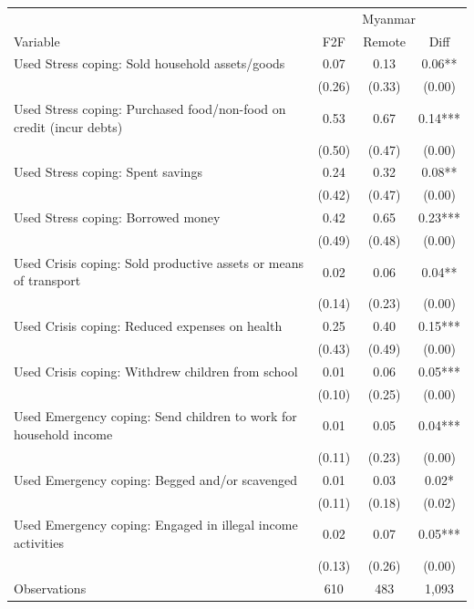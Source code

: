 \begin{tabular}{l*{3}c}
\hline\hline
 & \multicolumn{3}{c}{Myanmar}\\ 
Variable & F2F & Remote & Diff \\
\hline
Used Stress coping: Sold household assets/goods&0.07&0.13&0.06**\\
&(0.26)&(0.33)&(0.00)\\
Used Stress coping: Purchased food/non-food on credit (incur debts)&0.53&0.67&0.14***\\
&(0.50)&(0.47)&(0.00)\\
Used Stress coping: Spent savings&0.24&0.32&0.08**\\
&(0.42)&(0.47)&(0.00)\\
Used Stress coping: Borrowed money&0.42&0.65&0.23***\\
&(0.49)&(0.48)&(0.00)\\
Used Crisis coping: Sold productive assets or means of transport&0.02&0.06&0.04**\\
&(0.14)&(0.23)&(0.00)\\
Used Crisis coping: Reduced expenses on health&0.25&0.40&0.15***\\
&(0.43)&(0.49)&(0.00)\\
Used Crisis coping: Withdrew children from school&0.01&0.06&0.05***\\
&(0.10)&(0.25)&(0.00)\\
Used Emergency coping: Send children to work for household income&0.01&0.05&0.04***\\
&(0.11)&(0.23)&(0.00)\\
Used Emergency coping: Begged and/or scavenged&0.01&0.03&0.02*\\
&(0.11)&(0.18)&(0.02)\\
Used Emergency coping: Engaged in illegal income activities&0.02&0.07&0.05***\\
&(0.13)&(0.26)&(0.00)\\
\hline
Observations & 610 & 483 & 1,093 \\
\hline\hline
\end{tabular}

